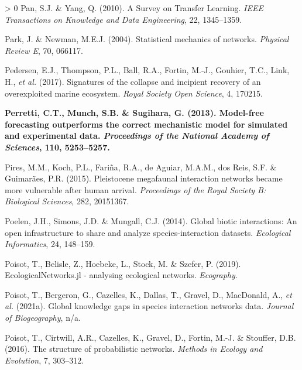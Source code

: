 \documentclass[11pt]{article}
\makeatletter
\def\maxwidth{\ifdim\Gin@nat@width>\linewidth\linewidth
\else\Gin@nat@width\fi}
\let\Oldincludegraphics\includegraphics
\renewcommand{\includegraphics}[1]{\Oldincludegraphics[width=\maxwidth]{#1}}
\newlength{\cslhangindent}
\newenvironment{CSLReferences}[3] %
 {%
  \setlength{\parindent}{0pt}
  \ifodd #1 \everypar{\setlength{\hangindent}{\cslhangindent}}\ignorespaces\fi
  \ifnum #2 > 0
  \setlength{\parskip}{#2\baselineskip}
  \fi
 }%
 {}
\providecommand{\DIFaddtex}[1]{{\bf #1}} %
\providecommand{\DIFdeltex}[1]{} %
\providecommand{\DIFaddbegin}{\protect\color{blue}} %
\providecommand{\DIFaddend}{\protect\color{black}} %
\providecommand{\DIFdelbegin}{\protect\color{red}} %
\providecommand{\DIFdelend}{\protect\color{black}} %
\providecommand{\DIFadd}[1]{\texorpdfstring{\DIFaddtex{#1}}{#1}} %
\providecommand{\DIFdel}[1]{\texorpdfstring{\DIFdeltex{#1}}{}} %
\newcommand{\DIFscaledelfig}{0.5}
\newlength{\DIFdelgraphicswidth} %
\newlength{\DIFdelgraphicsheight} %
\newcommand{\DIFaddincludegraphics}[2][]{{\color{blue}\fbox{\DIFOincludegraphics[#1]{#2}}}} %
\newcommand{\DIFdelincludegraphics}[2][]{%
\sbox{\DIFdelgraphicsbox}{\DIFOincludegraphics[#1]{#2}}%
\settoboxwidth{\DIFdelgraphicswidth}{\DIFdelgraphicsbox} %
\settoboxtotalheight{\DIFdelgraphicsheight}{\DIFdelgraphicsbox} %
\scalebox{\DIFscaledelfig}{%
\parbox[b]{\DIFdelgraphicswidth}{\usebox{\DIFdelgraphicsbox}\\[-\baselineskip] \rule{\DIFdelgraphicswidth}{0em}}\llap{\resizebox{\DIFdelgraphicswidth}{\DIFdelgraphicsheight}{%
\setlength{\unitlength}{\DIFdelgraphicswidth}%
\begin{picture}(1,1)%
\thicklines\linethickness{2pt} %
{\color[rgb]{1,0,0}\put(0,0){\framebox(1,1){}}}%
{\color[rgb]{1,0,0}\put(0,0){\line( 1,1){1}}}%
{\color[rgb]{1,0,0}\put(0,1){\line(1,-1){1}}}%
\end{picture}%
}\hspace*{3pt}}} %
} %
\DeclareRobustCommand{\DIFaddbegin}{\DIFOaddbegin \let\includegraphics\DIFaddincludegraphics} %
\DeclareRobustCommand{\DIFaddend}{\DIFOaddend \let\includegraphics\DIFOincludegraphics} %
\DeclareRobustCommand{\DIFdelbegin}{\DIFOdelbegin \let\includegraphics\DIFdelincludegraphics} %
\DeclareRobustCommand{\DIFdelend}{\DIFOaddend \let\includegraphics\DIFOincludegraphics} %
\makeatother
\begin{document}
\begin{CSLReferences}{1}{0}
\leavevmode\hypertarget{ref-Pan2010SurTra}{}%
Pan, S.J. \& Yang, Q. (2010). A Survey on Transfer Learning. \emph{IEEE
Transactions on Knowledge and Data Engineering}, 22, 1345--1359.

\leavevmode\hypertarget{ref-Park2004StaMec}{}%
Park, J. \& Newman, M.E.J. (2004). Statistical mechanics of networks.
\emph{Physical Review E}, 70, 066117.

\leavevmode\hypertarget{ref-Pedersen2017SigCol}{}%
Pedersen, E.J., Thompson, P.L., Ball, R.A., Fortin, M.-J., Gouhier,
T.C., Link, H., \emph{et al.} (2017). Signatures of the collapse and
incipient recovery of an overexploited marine ecosystem. \emph{Royal
Society Open Science}, 4, 170215.

\leavevmode\DIFaddbegin \hypertarget{ref-Perretti2013ModFor}{}%
\DIFadd{Perretti, C.T., Munch, S.B. \& Sugihara, G. (2013). Model-free
forecasting outperforms the correct mechanistic model for simulated and
experimental data. \emph{Proceedings of the National Academy of
Sciences}, 110, 5253--5257.
}

\leavevmode\DIFaddend \hypertarget{ref-Pires2015PleMeg}{}%
Pires, M.M., Koch, P.L., Fariña, R.A., de Aguiar, M.A.M., dos Reis, S.F.
\& Guimarães, P.R. (2015). Pleistocene megafaunal interaction networks
became more vulnerable after human arrival. \emph{Proceedings of the
Royal Society B: Biological Sciences}, 282, 20151367.

\leavevmode\hypertarget{ref-Poelen2014GloBio}{}%
Poelen, J.H., Simons, J.D. \& Mungall, C.J. (2014). Global biotic
interactions: An open infrastructure to share and analyze
species-interaction datasets. \emph{Ecological Informatics}, 24,
148--159.

\leavevmode\hypertarget{ref-Poisot2019EcoJl}{}%
Poisot, T., Belisle, Z., Hoebeke, L., Stock, M. \& Szefer, P. (2019).
EcologicalNetworks.jl - analysing ecological networks. \emph{Ecography}.

\leavevmode\hypertarget{ref-Poisot2021GloKno}{}%
Poisot, T., Bergeron, G., Cazelles, K., Dallas, T., Gravel, D.,
MacDonald, A., \emph{et al.} (2021a). Global knowledge gaps in species
interaction networks data. \emph{Journal of Biogeography}, n/a.

\leavevmode\DIFdelbegin %
\DIFdel{Poisot, T., Canard, E., Mouillot, D., Mouquet, N. \& Gravel, D. (2012).
The dissimilarity of species interaction networks. \emph{Ecology
Letters}, 15, 1353--1361.
}%

\DIFdelend \hypertarget{ref-Poisot2016StrPro}{}%
Poisot, T., Cirtwill, A.R., Cazelles, K., Gravel, D., Fortin, M.-J. \&
Stouffer, D.B. (2016). The structure of probabilistic networks.
\emph{Methods in Ecology and Evolution}, 7, 303--312.


\end{CSLReferences}
\end{document}

